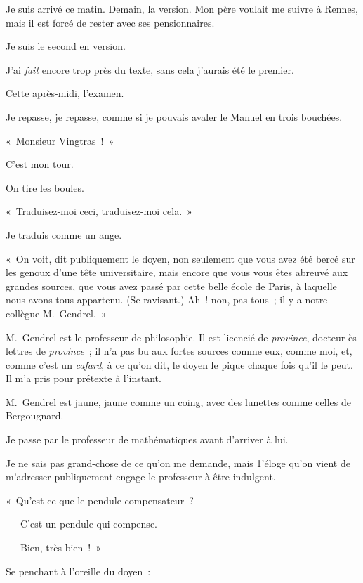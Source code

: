 \documentclass[french,twoside]{book} %
\def\mednobreak{\ifdim\lastskip<\medskipamount
  \removelastskip\nopagebreak\medskip\fi}
\newcommand{\labelblock}[1]{\medbreak{\noindent\color{rubric}\bfseries #1}\par\mednobreak}
\begin{document}
\labelblock{Rennes, lundi.}

\noindent Je suis arrivé ce matin. Demain, la version. Mon père voulait me suivre à Rennes, mais il est forcé de rester avec ses pensionnaires.\par

\labelblock{Mardi.}

\noindent Je suis le second en version.\par
J’ai \emph{fait} encore trop près du texte, sans cela j’aurais été le premier.\par
\bigbreak
\noindent Cette après-midi, l’examen.\par
Je repasse, je repasse, comme si je pouvais avaler le Manuel en trois bouchées.\par
« Monsieur Vingtras ! »\par
C’est mon tour.\par
On tire les boules.\par
« Traduisez-moi ceci, traduisez-moi cela. »\par
Je traduis comme un ange.\par
« On voit, dit publiquement le doyen, non seulement que vous avez été bercé sur les genoux d’une tête universitaire, mais encore que vous vous êtes abreuvé aux grandes sources, que vous avez passé par cette belle école de Paris, à laquelle nous avons tous appartenu. (Se ravisant.) Ah ! non, pas tous ; il y a notre collègue M. Gendrel. »\par
M. Gendrel est le professeur de philosophie. Il est licencié de \emph{province}, docteur ès lettres de \emph{province} ; il n’a pas bu aux fortes sources comme eux, comme moi, et, comme c’est un \emph{cafard}, à ce qu’on dit, le doyen le pique chaque fois qu’il le peut. Il m’a pris pour prétexte à l’instant.\par
M. Gendrel est jaune, jaune comme un coing, avec des lunettes comme celles de Bergougnard.\par
\bigbreak
\noindent Je passe par le professeur de mathématiques avant d’arriver à lui.\par
Je ne sais pas grand-chose de ce qu’on me demande, mais 1’éloge qu’on vient de m’adresser publiquement engage le professeur à être indulgent.\par
« Qu’est-ce que le pendule compensateur ?\par
— C’est un pendule qui compense.\par
— Bien, très bien ! »\par
Se penchant à l’oreille du doyen :\par
\end{document}
